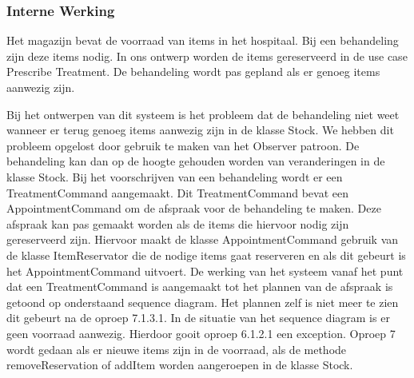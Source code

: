 \documentclass[a4paper]{article}
\begin{document}
\subsubsection{Interne Werking}
Het magazijn bevat de voorraad van items in het hospitaal. Bij een behandeling zijn deze items nodig. In ons ontwerp worden de items gereserveerd in de use case Prescribe Treatment. De behandeling wordt pas gepland als er genoeg items aanwezig zijn.
 
Bij het ontwerpen van dit systeem is het probleem dat de behandeling niet weet wanneer er terug genoeg items aanwezig zijn in de klasse Stock. We hebben dit probleem opgelost door gebruik te maken van het Observer patroon. De behandeling kan dan op de hoogte gehouden worden van veranderingen in de klasse Stock. Bij het voorschrijven van een behandeling wordt er een TreatmentCommand aangemaakt. Dit TreatmentCommand bevat een AppointmentCommand om de afspraak voor de behandeling te maken. Deze afspraak kan pas gemaakt worden als de items die hiervoor nodig zijn gereserveerd zijn. Hiervoor maakt de klasse AppointmentCommand  gebruik van de klasse ItemReservator die de nodige items gaat reserveren en als dit gebeurt is het AppointmentCommand uitvoert. De werking van het systeem vanaf het punt dat een TreatmentCommand is aangemaakt tot het plannen van de afspraak is getoond op onderstaand sequence diagram. Het plannen zelf is niet meer te zien dit gebeurt na de oproep 7.1.3.1. In de situatie van het sequence diagram is er geen voorraad aanwezig. Hierdoor gooit oproep 6.1.2.1 een exception. Oproep 7 wordt gedaan als er nieuwe items zijn in de voorraad, als de methode removeReservation of addItem worden aangeroepen in de klasse Stock.
\end{document}
